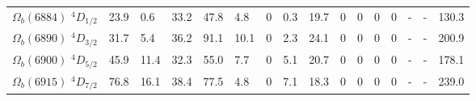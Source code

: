 \begin{tabular}{c |  p{0.58cm}  p{0.58cm}  p{0.58cm}  p{0.58cm}  p{0.58cm}  p{0.58cm}  p{0.58cm}  p{0.58cm}  p{0.58cm}  p{0.58cm}  p{0.58cm}  p{0.58cm}  p{0.58cm}  p{0.58cm}p{0.75cm}}
$\Omega_b(6884)$ $^{4}D_{1/2}$&23.9   &0.6   &33.2   &47.8   &4.8   &$0$   &0.3   &19.7   &$0$   &$0$   &$0$   &$0$   &-   &-   &130.3  \\
$\Omega_b(6890)$ $^{4}D_{3/2}$&31.7   &5.4   &36.2   &91.1   &10.1   &$0$   &2.3   &24.1   &$0$   &$0$   &$0$   &$0$   &-   &-   &200.9  \\
$\Omega_b(6900)$ $^{4}D_{5/2}$&45.9   &11.4   &32.3   &55.0   &7.7   &$0$   &5.1   &20.7   &$0$   &$0$   &$0$   &$0$   &-   &-   &178.1  \\
$\Omega_b(6915)$ $^{4}D_{7/2}$&76.8   &16.1   &38.4   &77.5   &4.8   &$0$   &7.1   &18.3   &$0$   &$0$   &$0$   &$0$   &-   &-   &239.0  \\
\hline \hline
\end{tabular}
